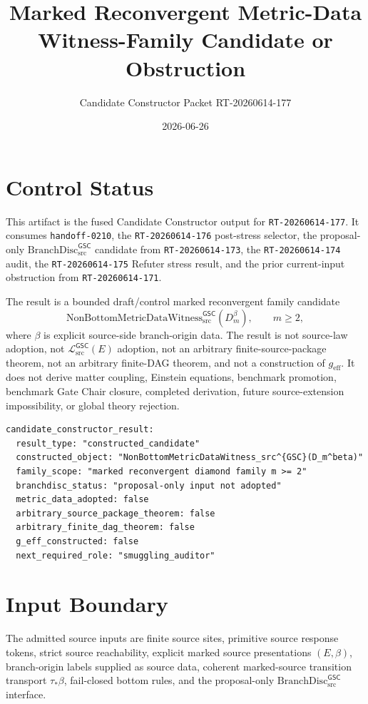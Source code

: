 \documentclass[11pt]{article}
\title{Marked Reconvergent Metric-Data Witness-Family Candidate or Obstruction}
\author{Candidate Constructor Packet RT-20260614-177}
\date{2026-06-26}
\newcommand{\Witness}{\mathrm{NonBottomMetricDataWitness}_{\mathrm{src}}^{\mathsf{GSC}}}
\newcommand{\MetricData}{\mathcal{L}_{\mathrm{src}}^{\mathsf{GSC}}}
\newcommand{\geff}{g_{\mathrm{eff}}}
\newcommand{\BranchDisc}{\mathrm{BranchDisc}_{\mathrm{src}}^{\mathsf{GSC}}}
\newcommand{\Dmbeta}{D_m^{\beta}}
\begin{document}
\maketitle

\section{Control Status}

This artifact is the fused Candidate Constructor output for
\texttt{RT-20260614-177}. It consumes \texttt{handoff-0210}, the
\texttt{RT-20260614-176} post-stress selector, the proposal-only
\(\BranchDisc\) candidate from \texttt{RT-20260614-173}, the
\texttt{RT-20260614-174} audit, the \texttt{RT-20260614-175} Refuter stress
result, and the prior current-input obstruction from \texttt{RT-20260614-171}.

The result is a bounded draft/control marked reconvergent family candidate
\[
  \Witness(\Dmbeta),\qquad m\ge 2,
\]
where \(\beta\) is explicit source-side branch-origin data. The result is not
source-law adoption, not \(\MetricData(E)\) adoption, not an arbitrary
finite-source-package theorem, not an arbitrary finite-DAG theorem, and not a
construction of \(\geff\). It does not derive matter coupling, Einstein
equations, benchmark promotion, benchmark Gate Chair closure, completed
derivation, future source-extension impossibility, or global theory rejection.

\begin{verbatim}
candidate_constructor_result:
  result_type: "constructed_candidate"
  constructed_object: "NonBottomMetricDataWitness_src^{GSC}(D_m^beta)"
  family_scope: "marked reconvergent diamond family m >= 2"
  branchdisc_status: "proposal-only input not adopted"
  metric_data_adopted: false
  arbitrary_source_package_theorem: false
  arbitrary_finite_dag_theorem: false
  g_eff_constructed: false
  next_required_role: "smuggling_auditor"
\end{verbatim}

\section{Input Boundary}

The admitted source inputs are finite source sites, primitive source response
tokens, strict source reachability, explicit marked source presentations
\((E,\beta)\), branch-origin labels supplied as source data, coherent
marked-source transition transport \(\tau_\ast\beta\), fail-closed bottom
rules, and the proposal-only \(\BranchDisc\) interface.
\end{document}
